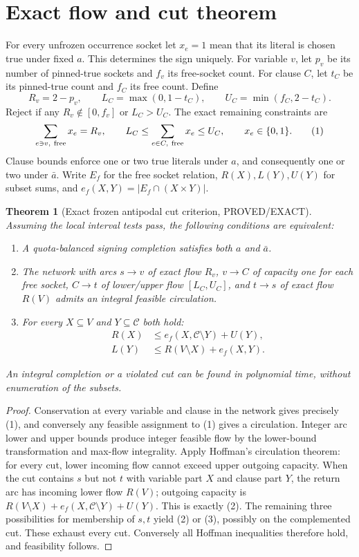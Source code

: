 \documentclass[11pt]{article}
\newtheorem{theorem}{Theorem}
\begin{document}
\section{Exact flow and cut theorem}
For every unfrozen occurrence socket let $x_e=1$ mean that its literal is chosen true under fixed $a$. This determines the sign uniquely. For variable $v$, let $p_v$ be its number of pinned-true sockets and $f_v$ its free-socket count. For clause $C$, let $t_C$ be its pinned-true count and $f_C$ its free count. Define
\[
R_v=2-p_v,\qquad L_C=\max(0,1-t_C),\qquad U_C=\min(f_C,2-t_C).
\]
Reject if any $R_v\notin[0,f_v]$ or $L_C>U_C$. The exact remaining constraints are
\[
\sum_{e\ni v,\ {\rm free}}x_e=R_v,\qquad
L_C\le\sum_{e\in C,\ {\rm free}}x_e\le U_C,\qquad x_e\in\{0,1\}. \tag{1}
\]
Clause bounds enforce one or two true literals under $a$, and consequently one or two under $\bar a$. Write $E_f$ for the free socket relation, $R(X),L(Y),U(Y)$ for subset sums, and $e_f(X,Y)=|E_f\cap(X\times Y)|$.
\begin{theorem}[Exact frozen antipodal cut criterion, PROVED/EXACT]
Assuming the local interval tests pass, the following conditions are equivalent:
\begin{enumerate}
\item[(i)] A quota-balanced signing completion satisfies both $a$ and $\bar a$.
\item[(ii)] The network with arcs $s\to v$ of exact flow $R_v$, $v\to C$ of capacity one for each free socket, $C\to t$ of lower/upper flow $[L_C,U_C]$, and $t\to s$ of exact flow $R(V)$ admits an integral feasible circulation.
\item[(iii)] For every $X\subseteq V$ and $Y\subseteq\mathcal C$ both hold:
\begin{align}
R(X)&\le e_f(X,\mathcal C\setminus Y)+U(Y), \tag{2}\\
L(Y)&\le R(V\setminus X)+e_f(X,Y). \tag{3}
\end{align}
\end{enumerate}
An integral completion or a violated cut can be found in polynomial time, without enumeration of the subsets.
\end{theorem}
\begin{proof}
Conservation at every variable and clause in the network gives precisely (1), and conversely any feasible assignment to (1) gives a circulation. Integer arc lower and upper bounds produce integer feasible flow by the lower-bound transformation and max-flow integrality. Apply Hoffman's circulation theorem: for every cut, lower incoming flow cannot exceed upper outgoing capacity. When the cut contains $s$ but not $t$ with variable part $X$ and clause part $Y$, the return arc has incoming lower flow $R(V)$; outgoing capacity is $R(V\setminus X)+e_f(X,\mathcal C\setminus Y)+U(Y)$. This is exactly (2). The remaining three possibilities for membership of $s,t$ yield (2) or (3), possibly on the complemented cut. These exhaust every cut. Conversely all Hoffman inequalities therefore hold, and feasibility follows.
\end{proof}
\end{document}
